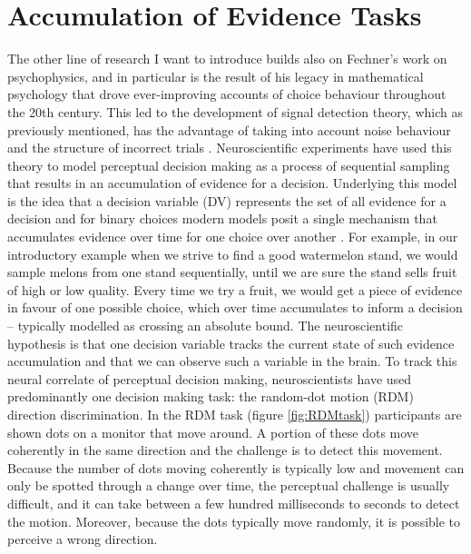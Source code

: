 \section{Accumulation of Evidence Tasks}
The other line of research I want to introduce builds also on Fechner’s work on psychophysics, and in particular is the result of his legacy in mathematical psychology that drove ever-improving accounts of choice behaviour throughout the 20th century. This led to the development of signal detection theory, which as previously mentioned, has the advantage of taking into account noise behaviour and the structure of incorrect trials \parencite{Tanner1954}. Neuroscientific experiments have used this theory to model perceptual decision making as a process of sequential sampling that results in an accumulation of evidence for a decision. Underlying this model is the idea that a decision variable (DV) represents the set of all evidence for a decision and for binary choices modern models posit a single mechanism that accumulates evidence over time for one choice over another \parencite{Shadlen2013}. For example, in our introductory example when we strive to find a good watermelon stand, we would sample melons from one stand sequentially, until we are sure the stand sells fruit of high or low quality. Every time we try a fruit, we would get a piece of evidence in favour of one possible choice, which over time accumulates to inform a decision – typically modelled as crossing an absolute bound. The neuroscientific hypothesis is that one decision variable tracks the current state of such evidence accumulation and that we can observe such a variable in the brain. 
To track this neural correlate of perceptual decision making, neuroscientists have used predominantly one decision making task: the random-dot motion (RDM) direction discrimination. In the RDM task (figure \ref{fig:RDMtask}) participants are shown dots on a monitor that move around. A portion of these dots move coherently in the same direction and the challenge is to detect this movement. Because the number of dots moving coherently is typically low and movement can only be spotted through a change over time, the perceptual challenge is usually difficult, and it can take between a few hundred milliseconds to seconds to detect the motion. Moreover, because the dots typically move randomly, it is possible to perceive a wrong direction.

